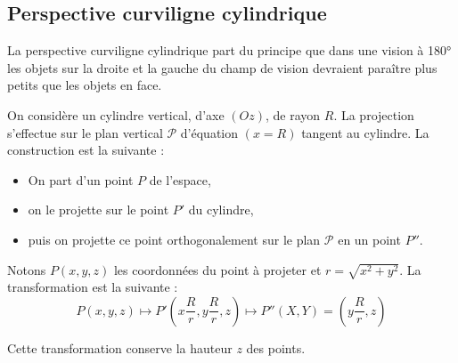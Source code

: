 \documentclass[11pt,class=report,crop=false]{standalone}
\begin{document}
\subsection{Perspective curviligne cylindrique}


La perspective curviligne cylindrique part du principe que dans une vision à \ang{180} les objets sur la droite et la gauche du champ de vision devraient paraître plus petits que les objets en face.

On considère un cylindre vertical, d'axe $(Oz)$, de rayon $R$. La projection s'effectue sur le plan vertical $\mathcal{P}$ d'équation $(x=R)$ tangent au cylindre.
La construction est la suivante : 
\begin{itemize}
  \item On part d'un point $P$ de l'espace,
  \item on le projette sur le point $P'$ du cylindre,
  \item puis on projette ce point orthogonalement sur le plan $\mathcal{P}$ en un point $P''$.
\end{itemize}





Notons $P(x,y,z)$ les coordonnées du point à projeter et $r = \sqrt{x^2+y^2}$. La transformation est la suivante :
$$P(x,y,z) \longmapsto P'\left(x\frac{R}{r} , y\frac{R}{r} , z\right) \longmapsto P''(X,Y) = \left(y \frac{R}{r},z\right)$$

Cette transformation conserve la hauteur $z$ des points.
\end{document}
